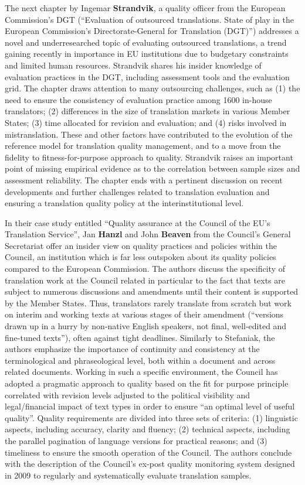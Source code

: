 \documentclass[output=paper]{langsci/langscibook}
\begin{document}
The next chapter by Ingemar \textbf{Strandvik}, a quality officer from the European Commission’s DGT (“Evaluation of outsourced translations. State of play in the European Commission's Directorate-General for Translation (DGT)”) addresses a novel and underresearched topic of evaluating outsourced translations, a trend gaining recently in importance in EU institutions due to budgetary constraints and limited human resources. Strandvik shares his insider knowledge of evaluation practices in the DGT, including assessment tools and the evaluation grid. The chapter draws attention to many outsourcing challenges, such as (1) the need to ensure the consistency of evaluation practice among 1600 in-house translators; (2) differences in the size of translation markets in various Member States; (3) time allocated for revision and evaluation; and (4) risks involved in mistranslation. These and other factors have contributed to the evolution of the reference model for translation quality management, and to a move from the fidelity to fitness-for-purpose approach to quality. Strandvik raises an important point of missing empirical evidence as to the correlation between sample sizes and assessment reliability. The chapter ends with a pertinent discussion on recent developments and further challenges related to translation evaluation and ensuring a translation quality policy at the interinstitutional level.

In their case study entitled “Quality assurance at the Council of the EU’s Translation Service”, Jan \textbf{Hanzl} and John \textbf{Beaven} from the Council’s General Secretariat offer an insider view on quality practices and policies within the Council, an institution which is far less outspoken about its quality policies compared to the European Commission. The authors discuss the specificity of translation work at the Council related in particular to the fact that texts are subject to numerous discussions and amendments until their content is supported by the Member States. Thus, translators rarely translate from scratch but work on interim and working texts at various stages of their amendment (“versions drawn up in a hurry by non-native English speakers, not final, well-edited and fine-tuned texts”), often against tight deadlines. Similarly to Stefaniak, the authors emphasize the importance of continuity and consistency at the terminological and phraseological level, both within a document and across related documents. Working in such a specific environment, the Council has adopted a pragmatic approach to quality based on the fit for purpose principle correlated with revision levels adjusted to the political visibility and legal/financial impact of text types in order to ensure “an optimal level of useful quality”. Quality requirements are divided into three sets of criteria: (1) linguistic aspects, including accuracy, clarity and fluency; (2) technical aspects, including the parallel pagination of language versions for practical reasons; and (3) timeliness to ensure the smooth operation of the Council. The authors conclude with the description of the Council’s ex-post quality monitoring system designed in 2009 to regularly and systematically evaluate translation samples.
\end{document}
